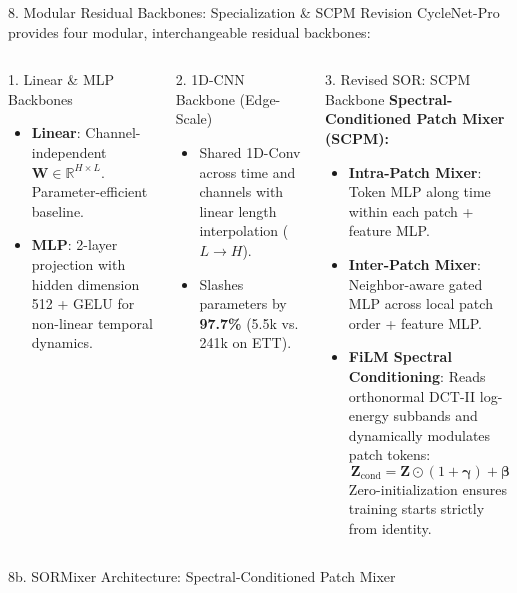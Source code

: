 \documentclass[aspectratio=169, 10pt]{beamer}
\begin{document}
\begin{frame}{8. Modular Residual Backbones: Specialization \& SCPM Revision}
CycleNet-Pro provides four modular, interchangeable residual backbones:
\vspace{0.15cm}
\begin{columns}[T]
\begin{block}{1. Linear \& MLP Backbones}
\begin{itemize}
    \item \textbf{Linear}: Channel-independent $\mathbf{W} \in \mathbb{R}^{H \times L}$. Parameter-efficient baseline.
    \item \textbf{MLP}: 2-layer projection with hidden dimension 512 + GELU for non-linear temporal dynamics.
\end{itemize}
\end{block}
\begin{block}{2. 1D-CNN Backbone (Edge-Scale)}
\begin{itemize}
    \item Shared 1D-Conv across time and channels with linear length interpolation ($L \to H$).
    \item Slashes parameters by \textbf{97.7\%} (5.5k vs. 241k on ETT).
\end{itemize}
\end{block}

\begin{exampleblock}{3. Revised SOR: SCPM Backbone}
\textbf{Spectral-Conditioned Patch Mixer (SCPM):}
\begin{itemize}
    \item \textbf{Intra-Patch Mixer}: Token MLP along time within each patch + feature MLP.
    \item \textbf{Inter-Patch Mixer}: Neighbor-aware gated MLP across local patch order + feature MLP.
    \item \textbf{FiLM Spectral Conditioning}: Reads orthonormal DCT-II log-energy subbands and dynamically modulates patch tokens:
    $$\mathbf{Z}_{\text{cond}} = \mathbf{Z} \odot (1 + \boldsymbol{\gamma}) + \boldsymbol{\beta}$$
    Zero-initialization ensures training starts strictly from identity.
\end{itemize}
\end{exampleblock}
\end{columns}
\end{frame}

\begin{frame}{8b. SORMixer Architecture: Spectral-Conditioned Patch Mixer}
\centering
\vspace{-0.15cm}
\resizebox{!}{0.76\textheight}{%
}
\end{frame}
\end{document}
